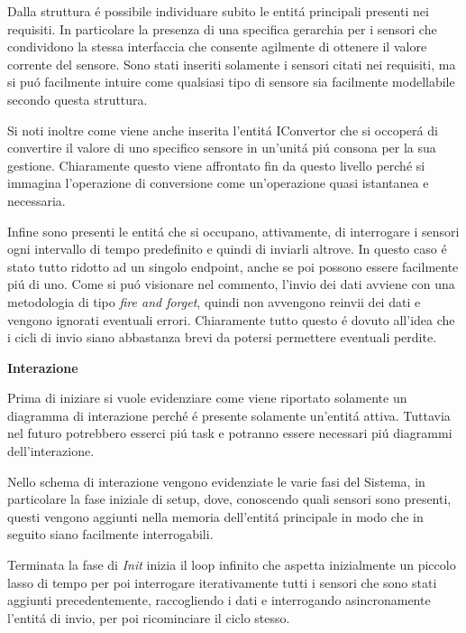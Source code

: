 Dalla struttura \'e possibile individuare subito le entit\'a principali presenti nei requisiti. In particolare la presenza di una specifica gerarchia per i sensori che condividono la stessa interfaccia che consente agilmente di ottenere il valore corrente del sensore. Sono stati inseriti solamente i sensori citati nei requisiti, ma si pu\'o facilmente intuire come qualsiasi tipo di sensore sia facilmente modellabile secondo questa struttura.

Si noti inoltre come viene anche inserita l'entit\'a IConvertor che si occoper\'a di convertire il valore di uno specifico sensore in un'unit\'a pi\'u consona per la sua gestione. Chiaramente questo viene affrontato fin da questo livello perch\'e si immagina l'operazione di conversione come un'operazione quasi istantanea e necessaria.

Infine sono presenti le entit\'a che si occupano, attivamente, di interrogare i sensori ogni intervallo di tempo predefinito e quindi di inviarli altrove. In questo caso \'e stato tutto ridotto ad un singolo endpoint, anche se poi possono essere facilmente pi\'u di uno. Come si pu\'o visionare nel commento, l'invio dei dati avviene con una metodologia di tipo \textit{fire and forget}, quindi non avvengono reinvii dei dati e vengono ignorati eventuali errori. Chiaramente tutto questo \'e dovuto all'idea che i cicli di invio siano abbastanza brevi da potersi permettere eventuali perdite.

\begin{center}
\textbf{Interazione}
\end{center}

Prima di iniziare si vuole evidenziare come viene riportato solamente un diagramma di interazione perch\'e \'e presente solamente un'entit\'a attiva. Tuttavia nel futuro potrebbero esserci pi\'u task e potranno essere necessari pi\'u diagrammi dell'interazione.

Nello schema di interazione vengono evidenziate le varie fasi del Sistema, in particolare la fase iniziale di setup, dove, conoscendo quali sensori sono presenti, questi vengono aggiunti nella memoria dell'entit\'a principale in modo che in seguito siano facilmente interrogabili.

Terminata la fase di \textit{Init} inizia il loop infinito che aspetta inizialmente un piccolo lasso di tempo per poi interrogare iterativamente tutti i sensori che sono stati aggiunti precedentemente, raccogliendo i dati e interrogando asincronamente l'entit\'a di invio, per poi ricominciare il ciclo stesso.

